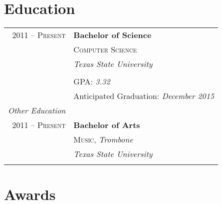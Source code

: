 \documentclass[10pt]{article} %
\begin{document}
\begin{minipage}[t]{0.44\textwidth}

\section{Education} 

\begin{tabular}{rl} %


2011 -- \textsc{Present} & \textbf{Bachelor of Science} \\ 
& \textsc{Computer Science} \\ 
& \textit{Texas State University}\\
&\\

& \large GPA: \textit{3.32} \\
& Anticipated Graduation: \textit{December 2015}\\
	 
\textit{Other Education} \\
2011 -- \textsc{Present} & \textbf{Bachelor of Arts} \\ 
& \textsc{Music}, \textit{Trombone}\\ 
& \textit{Texas State University}\\ \\


\end{tabular}


\section{Awards} 


\end{minipage}
\end{document}

